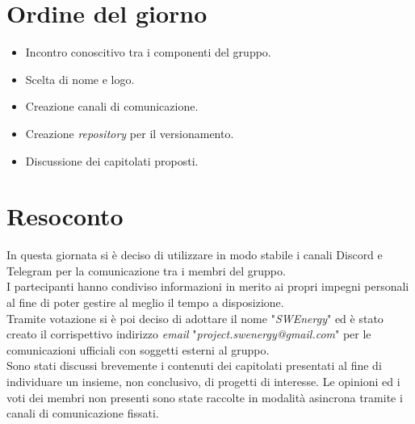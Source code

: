 \section{Ordine del giorno}
\begin{itemize}
	\item Incontro conoscitivo tra i componenti del gruppo.
	\item Scelta di nome e logo.
	\item Creazione canali di comunicazione.
	\item Creazione \textit{repository} per il versionamento.
	\item Discussione dei capitolati proposti.
\end{itemize}

\section{Resoconto}
In questa giornata si è deciso di utilizzare in modo stabile i canali Discord e Telegram per la comunicazione tra i membri del gruppo.\\
I partecipanti hanno condiviso informazioni in merito ai propri impegni personali al fine di poter gestire al meglio il tempo a disposizione. \\

\noindent
Tramite votazione si è poi deciso di adottare il nome "\textit{SWEnergy}" ed è stato creato il corrispettivo indirizzo \textit{email} "\textit{project.swenergy@gmail.com}" per le comunicazioni ufficiali con soggetti esterni al gruppo. \\

\noindent
Sono stati discussi brevemente i contenuti dei capitolati presentati al fine di individuare un insieme, non conclusivo, di progetti di interesse.
Le opinioni ed i voti dei membri non presenti sono state raccolte in modalità asincrona tramite i canali di comunicazione fissati.
